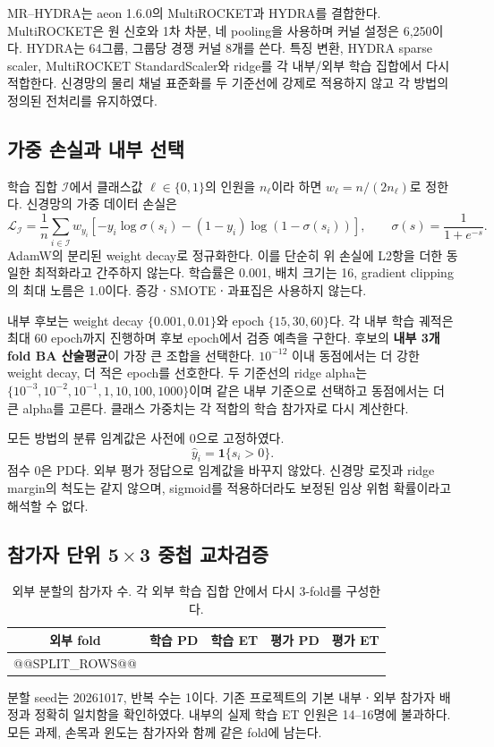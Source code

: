 \documentclass[11pt,a4paper]{article}
\newcommand{\ind}{\mathbf{1}}
\numberwithin{equation}{section}
\begin{document}
MR--HYDRA는 aeon 1.6.0의 MultiROCKET\cite{multirocket}과
HYDRA\cite{hydra}를 결합한다. MultiROCKET은 원 신호와 1차 차분, 네 pooling을
사용하며 커널 설정은 6,250이다. HYDRA는 64그룹, 그룹당 경쟁 커널 8개를 쓴다.
특징 변환, HYDRA sparse scaler, MultiROCKET StandardScaler와 ridge를
각 내부/외부 학습 집합에서 다시 적합한다. 신경망의 물리 채널 표준화를 두
기준선에 강제로 적용하지 않고 각 방법의 정의된 전처리를 유지하였다.

\subsection{가중 손실과 내부 선택}
학습 집합 $\mathcal I$에서 클래스값 $\ell\in\{0,1\}$의 인원을 $n_\ell$이라 하면
$w_\ell=n/(2n_\ell)$로 정한다. 신경망의 가중 데이터 손실은
\begin{equation}
 \mathcal L_{\mathcal I}=\frac1n\sum_{i\in\mathcal I}w_{y_i}
 \left[-y_i\log\sigma(s_i)-(1-y_i)\log(1-\sigma(s_i))\right],
 \qquad\sigma(s)=\frac1{1+e^{-s}}.
\end{equation}
AdamW의 분리된 weight decay로 정규화한다. 이를 단순히 위 손실에 L2항을
더한 동일한 최적화라고 간주하지 않는다. 학습률은 0.001, 배치 크기는 16,
gradient clipping의 최대 노름은 1.0이다. 증강ㆍSMOTEㆍ과표집은 사용하지 않는다.

내부 후보는 weight decay $\{0.001,0.01\}$와 epoch $\{15,30,60\}$다.
각 내부 학습 궤적은 최대 60 epoch까지 진행하며 후보 epoch에서 검증 예측을
구한다. 후보의 \textbf{내부 3개 fold BA 산술평균}이 가장 큰 조합을 선택한다.
$10^{-12}$ 이내 동점에서는 더 강한 weight decay, 더 적은 epoch를 선호한다.
두 기준선의 ridge alpha는 $\{10^{-3},10^{-2},10^{-1},1,10,100,1000\}$이며
같은 내부 기준으로 선택하고 동점에서는 더 큰 alpha를 고른다.
클래스 가중치는 각 적합의 학습 참가자로 다시 계산한다.

모든 방법의 분류 임계값은 사전에 0으로 고정하였다.
\begin{equation}
 \widehat y_i=\ind\{s_i>0\}.\label{eq:threshold}
\end{equation}
점수 0은 PD다. 외부 평가 정답으로 임계값을 바꾸지 않았다.
신경망 로짓과 ridge margin의 척도는 같지 않으며,
sigmoid를 적용하더라도 보정된 임상 위험 확률이라고 해석할 수 없다.

\subsection{참가자 단위 5\,$\times$\,3 중첩 교차검증}
\begin{table}[H]\centering\small
\caption{외부 분할의 참가자 수. 각 외부 학습 집합 안에서 다시 3-fold를 구성한다.}
\begin{tabular}{@{}crrrr@{}}\toprule
 외부 fold & 학습 PD & 학습 ET & 평가 PD & 평가 ET\\\midrule
@@SPLIT_ROWS@@
\bottomrule\end{tabular}\label{tab:splits}
\end{table}
분할 seed는 20261017, 반복 수는 1이다. 기존 프로젝트의 기본 내부ㆍ외부
참가자 배정과 정확히 일치함을 확인하였다. 내부의 실제 학습 ET 인원은
14--16명에 불과하다. 모든 과제, 손목과 윈도는 참가자와 함께 같은 fold에 남는다.
\end{document}
